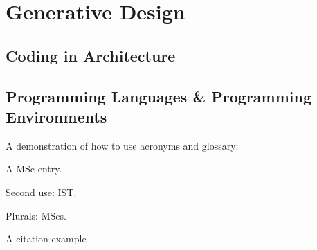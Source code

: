 
\chapter{Generative Design}
\label{chapter:generativeDesign}

\section{Coding in Architecture}

\section{Programming Languages \& Programming Environments}

A demonstration of how to use acronyms and glossary:

A \gls{MSc} entry.

Second use: \gls{IST}.

Plurals: \glspl{MSc}.

A citation example \cite{nobody}
